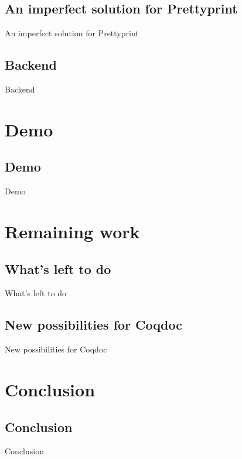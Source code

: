 \documentclass[compress]{beamer}
\newenvironment{tframe}[1]{
  \subsection{#1}
  \begin{frame}{#1}
  }{
  \end{frame}
  }
\begin{document}
  \begin{tframe}{An imperfect solution for Prettyprint}
  \end{tframe}

  \begin{tframe}{Backend}
  \end{tframe}

\section{Demo}
  \begin{tframe}{Demo}
  \end{tframe}

\section{Remaining work}
  \begin{tframe}{What's left to do}
  \end{tframe}
  \begin{tframe}{New possibilities for Coqdoc}
  \end{tframe}

\section{Conclusion}
  \begin{tframe}{Conclusion}
  \end{tframe}
\end{document}
